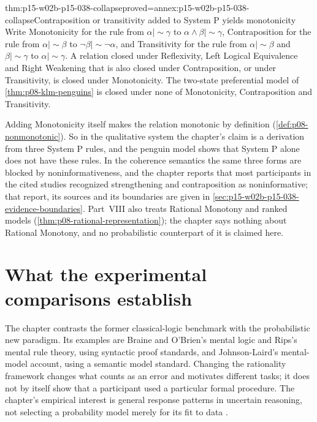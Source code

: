 \begin{hbtheorem}{thm:p15-w02b-p15-038-collapse}{proved=annex:p15-w02b-p15-038-collapse}{Contraposition or transitivity added to System P yields monotonicity}
Write Monotonicity for the rule from \(\alpha\mathrel{|\!\sim}\gamma\)
to \(\alpha\wedge\beta\mathrel{|\!\sim}\gamma\), Contraposition for
the rule from \(\alpha\mathrel{|\!\sim}\beta\) to
\(\neg\beta\mathrel{|\!\sim}\neg\alpha\), and Transitivity for the rule
from \(\alpha\mathrel{|\!\sim}\beta\) and
\(\beta\mathrel{|\!\sim}\gamma\) to
\(\alpha\mathrel{|\!\sim}\gamma\). A relation closed under
Reflexivity, Left Logical Equivalence and Right Weakening that is also
closed under Contraposition, or under Transitivity, is closed under
Monotonicity. The two-state preferential model of
\cref{thm:p08-klm-penguins} is closed under none of Monotonicity,
Contraposition and Transitivity.
\end{hbtheorem}

Adding Monotonicity itself makes the relation monotonic by definition
(\cref{def:p08-nonmonotonic}). So in the qualitative system the
chapter's claim is a derivation from three System P rules, and the
penguin model shows that System P alone does not have these rules. In
the coherence semantics the same three forms are blocked by
noninformativeness, and the chapter reports that most participants in
the cited studies recognized strengthening and contraposition as
noninformative; that report, its sources and its boundaries are given
in \cref{sec:p15-w02b-p15-038-evidence-boundaries}.
Part~VIII also treats Rational Monotony and ranked models
(\cref{thm:p08-rational-representation}); the chapter says nothing
about Rational Monotony, and no probabilistic counterpart of it is
claimed here.

\section{What the experimental comparisons establish}

The chapter contrasts the former classical-logic benchmark with the
probabilistic new paradigm. Its examples are Braine and O'Brien's
mental logic and Rips's mental rule theory, using syntactic proof
standards, and Johnson-Laird's mental-model account, using a semantic
model standard. Changing the rationality framework changes what counts
as an error and motivates different tasks; it does not by itself show
that a participant used a particular formal procedure. The chapter's
empirical interest is general response patterns in uncertain reasoning,
not selecting a probability model merely for its fit to data
\cite[pp.~277,279]{Pfeifer2021ProbabilityLogic}.

